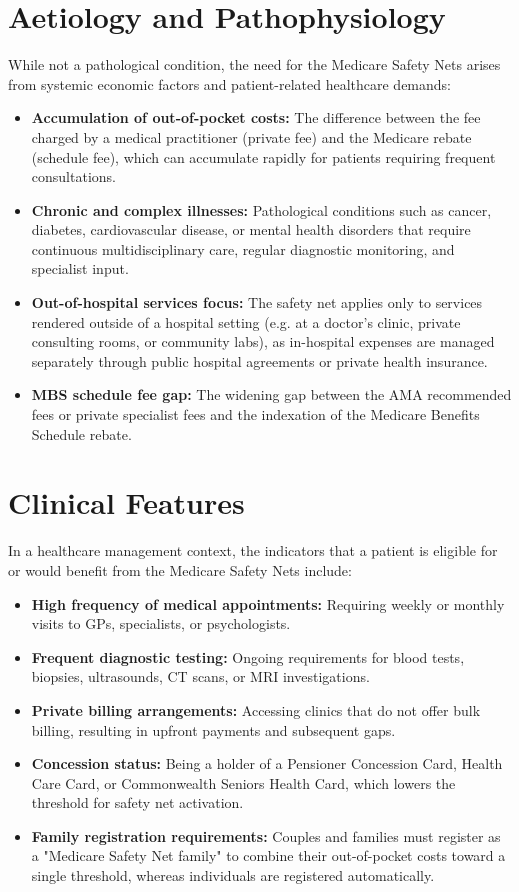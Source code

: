 \section*{Aetiology and Pathophysiology}
While not a pathological condition, the need for the Medicare Safety Nets arises from systemic economic factors and patient-related healthcare demands:
\begin{itemize}
    \item \textbf{Accumulation of out-of-pocket costs:} The difference between the fee charged by a medical practitioner (private fee) and the Medicare rebate (schedule fee), which can accumulate rapidly for patients requiring frequent consultations.
    \item \textbf{Chronic and complex illnesses:} Pathological conditions such as cancer, diabetes, cardiovascular disease, or mental health disorders that require continuous multidisciplinary care, regular diagnostic monitoring, and specialist input.
    \item \textbf{Out-of-hospital services focus:} The safety net applies only to services rendered outside of a hospital setting (e.g. at a doctor's clinic, private consulting rooms, or community labs), as in-hospital expenses are managed separately through public hospital agreements or private health insurance.
    \item \textbf{MBS schedule fee gap:} The widening gap between the AMA recommended fees or private specialist fees and the indexation of the Medicare Benefits Schedule rebate.
\end{itemize}

\section*{Clinical Features}
In a healthcare management context, the indicators that a patient is eligible for or would benefit from the Medicare Safety Nets include:
\begin{itemize}
    \item \textbf{High frequency of medical appointments:} Requiring weekly or monthly visits to GPs, specialists, or psychologists.
    \item \textbf{Frequent diagnostic testing:} Ongoing requirements for blood tests, biopsies, ultrasounds, CT scans, or MRI investigations.
    \item \textbf{Private billing arrangements:} Accessing clinics that do not offer bulk billing, resulting in upfront payments and subsequent gaps.
    \item \textbf{Concession status:} Being a holder of a Pensioner Concession Card, Health Care Card, or Commonwealth Seniors Health Card, which lowers the threshold for safety net activation.
    \item \textbf{Family registration requirements:} Couples and families must register as a "Medicare Safety Net family" to combine their out-of-pocket costs toward a single threshold, whereas individuals are registered automatically.
\end{itemize}

